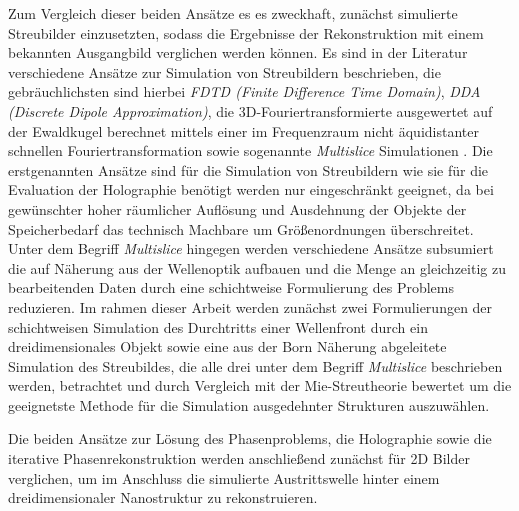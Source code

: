 Zum Vergleich dieser beiden  Ansätze es es zweckhaft, zunächst simulierte Streubilder einzusetzten, sodass die Ergebnisse der Rekonstruktion mit einem bekannten Ausgangbild verglichen werden können. Es sind in der Literatur verschiedene Ansätze zur Simulation von Streubildern beschrieben, die gebräuchlichsten sind hierbei  \textit{FDTD (Finite Difference Time Domain)}, \textit{DDA (Discrete Dipole Approximation)}, die 3D-Fouriertransformierte ausgewertet auf der Ewaldkugel berechnet mittels einer im Frequenzraum nicht äquidistanter schnellen Fouriertransformation sowie sogenannte \textit{Multislice} Simulationen \cite{drezek1999,sander2014,hantke2016,hare1994,barke2015}. Die erstgenannten Ansätze sind für die Simulation von Streubildern wie sie für die Evaluation der Holographie benötigt werden nur eingeschränkt geeignet, da bei gewünschter hoher räumlicher Auflösung und Ausdehnung der Objekte der Speicherbedarf das technisch Machbare um Größenordnungen überschreitet. Unter dem Begriff \textit{Multislice} hingegen werden verschiedene Ansätze subsumiert die auf Näherung aus der Wellenoptik aufbauen und die Menge an gleichzeitig zu bearbeitenden Daten durch eine schichtweise Formulierung des Problems reduzieren. Im rahmen dieser Arbeit werden zunächst zwei Formulierungen der schichtweisen Simulation des Durchtritts einer Wellenfront durch ein dreidimensionales Objekt sowie eine aus der Born Näherung abgeleitete Simulation des Streubildes, die alle drei unter dem Begriff \textit{Multislice} beschrieben werden, betrachtet und durch Vergleich mit der Mie-Streutheorie bewertet um die geeignetste Methode für die Simulation ausgedehnter Strukturen auszuwählen.

Die beiden Ansätze zur Lösung des Phasenproblems, die Holographie sowie die iterative Phasenrekonstruktion werden anschließend zunächst für 2D Bilder verglichen, um im Anschluss die simulierte Austrittswelle hinter einem dreidimensionaler Nanostruktur zu rekonstruieren.

